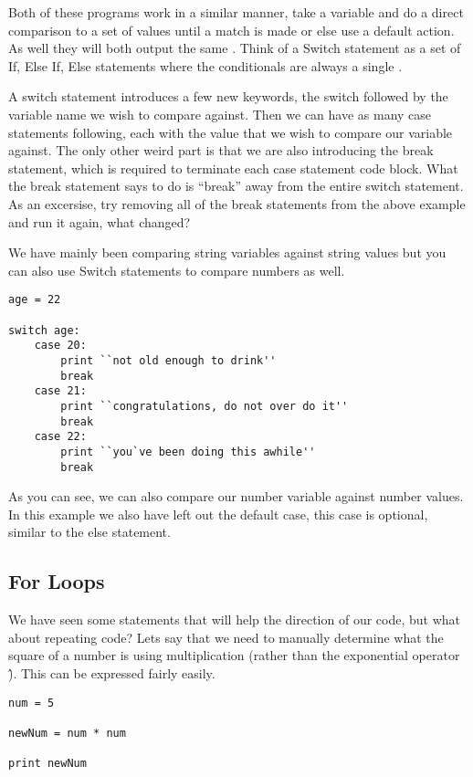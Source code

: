 Both of these programs work in a similar manner, take a variable and do a direct comparison to a set of values until a match is made or else use a default action.
As well they will both output the same .
Think of a Switch statement as a set of If, Else If, Else statements where the conditionals are always a single \pigVar{==}.
\par

A switch statement introduces a few new keywords, the switch followed by the variable name we wish to compare against.
Then we can have as many case statements following, each with the value that we wish to compare our variable against.
The only other weird part is that we are also introducing the break statement, which is required to terminate each case statement code block.
What the break statement says to do is ``break'' away from the entire switch statement.
As an excersise, try removing all of the break statements from the above example and run it again, what changed?
\par

We have mainly been comparing string variables against string values but you can also use Switch statements to compare numbers as well.

\begin{lstlisting}[caption={Switch Statement Numbers Example}]
age = 22

switch age:
    case 20:
        print ``not old enough to drink''
        break
    case 21:
        print ``congratulations, do not over do it''
        break
    case 22:
        print ``you`ve been doing this awhile''
        break
\end{lstlisting}

As you can see, we can also compare our number variable against number values.
In this example we also have left out the default case, this case is optional, similar to the else statement.

\subsection{For Loops}
We have seen some statements that will help the direction of our code, but what about repeating code?
Lets say that we need to manually determine what the square of a number is using multiplication (rather than the exponential operator \^).
This can be expressed fairly easily.

\begin{lstlisting}[caption={Square Without Loop}]
num = 5

newNum = num * num

print newNum
\end{lstlisting}

